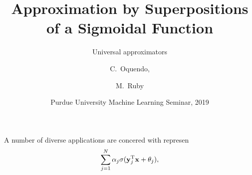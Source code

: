 \documentclass[12pt,letterpape]{beamer}
\title[Approximation by a Sigmoidal Function] 
{Approximation by Superpositions of a Sigmoidal Function}
\subtitle{Universal approximators}
\author[C.\ Salinas, M.\ Ruby] 
{C.\ Oquendo,%
  \and M.\ Ruby%
}
\institute[Purdue University] %
{
  Department of Mathematics\\
  Purdue University
 }
\date[Spring 2019] %
{Purdue University Machine Learning Seminar, 2019}
\begin{document}
\frame{\titlepage}

\begin{frame}
  A number of diverse applications are concered with represen
  \[
    \sum_{j=1}^N\alpha_j\sigma(\mathbf{y}_j^{\mathrm{T}}\mathbf{x}+\theta_j),
  \]
\end{frame}
\end{document}
